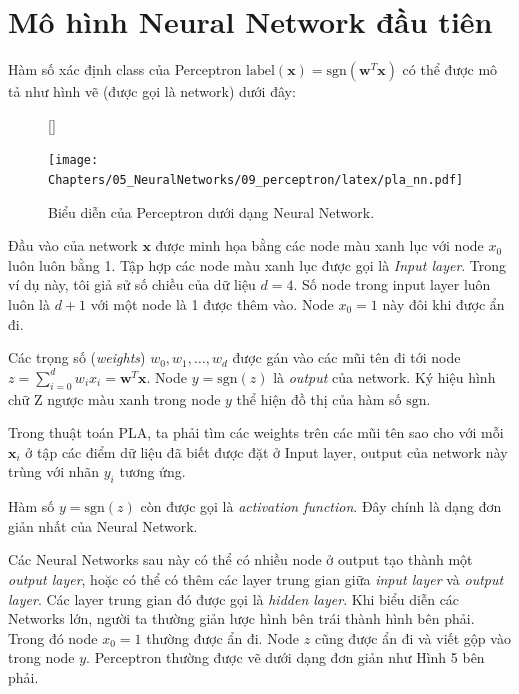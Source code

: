  
\section{Mô hình Neural Network đầu tiên}
Hàm số xác định class của Perceptron $\text{label}(\mathbf{x}) = \text{sgn}(\mathbf{w}^T\mathbf{x})$ có thể được mô tả như hình vẽ (được gọi là network) dưới đây: 
 
\begin{figure}[t]
     [\FBwidth]
     {\caption{ 
     Biểu diễn của Perceptron dưới dạng Neural Network.
     }
     \label{fig:9_5}}
     { %
     \texttt{[image: Chapters/05\_NeuralNetworks/09\_perceptron/latex/pla\_nn.pdf]}
     }
 \end{figure}
  
Đầu vào của network $\mathbf{x}$ được minh họa bằng các node màu xanh lục với node $x_0$ luôn luôn bằng 1. Tập hợp các node màu xanh lục được gọi là \textit{Input layer}. Trong ví dụ này, tôi giả sử số chiều của dữ liệu $d = 4$. Số node trong input layer luôn luôn là $d + 1$ với một node là 1 được thêm vào. Node $x_0 = 1$ này đôi khi được ẩn đi.  
 
Các trọng số (\textit{weights}) $w_0, w_1, \dots, w_d$ được gán vào các mũi tên đi tới node $\displaystyle z = \sum_{i=0}^dw_ix_i = \mathbf{w}^T\mathbf{x}$. Node $y = \text{sgn}(z)$ là \textit{output} của network. Ký hiệu hình chữ Z ngược màu xanh trong node $y$ thể hiện đồ thị của hàm số $\text{sgn}$.  
 
Trong thuật toán PLA, ta phải tìm các weights trên các mũi tên sao cho với mỗi $\mathbf{x}_i$ ở tập các điểm dữ liệu đã biết được đặt ở Input layer, output của network này trùng với nhãn $y_i$ tương ứng.  
 
Hàm số $y = \text{sgn}(z)$ còn được gọi là \textit{activation function}. Đây chính là dạng đơn giản nhất của Neural Network. 
 
 
Các Neural Networks sau này có thể có nhiều node ở output tạo thành một \textit{output layer}, hoặc có thể có thêm các layer trung gian giữa \textit{input layer} và \textit{output layer}. Các layer trung gian đó được gọi là \textit{hidden layer}. Khi biểu diễn các Networks lớn, người ta thường giản lược hình bên trái thành hình bên phải. Trong đó node $x_0 = 1$ thường được ẩn đi. Node $z$ cũng được ẩn đi và viết gộp vào trong node $y$. Perceptron thường được vẽ dưới dạng đơn giản như Hình 5 bên phải.  
 
